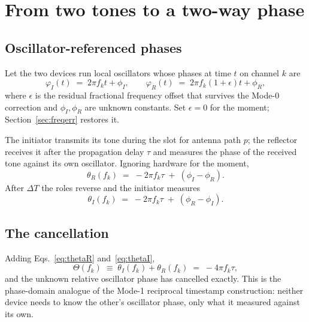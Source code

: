 \documentclass[11pt,a4paper]{article}
\begin{document}
\section{From two tones to a two-way phase}
\label{sec:twoway}

\subsection{Oscillator-referenced phases}

Let the two devices run local oscillators whose phases at time $t$ on channel $k$ are
\begin{equation}
\varphi_I(t) \;=\; 2\pi f_k t + \phi_I ,
\qquad
\varphi_R(t) \;=\; 2\pi f_k (1+\epsilon) t + \phi_R ,
\label{eq:los}
\end{equation}
where $\epsilon$ is the residual fractional frequency offset that survives the Mode-0 correction and
$\phi_I,\phi_R$ are unknown constants. Set $\epsilon=0$ for the moment; Section~\ref{sec:freqerr}
restores it.

The initiator transmits its tone during the slot for antenna path $p$; the reflector receives it
after the propagation delay $\tau$ and measures the phase of the received tone against its own
oscillator. Ignoring hardware for the moment,
\begin{equation}
\theta_R(f_k) \;=\; -2\pi f_k \tau \;+\; (\phi_I - \phi_R) .
\label{eq:thetaR}
\end{equation}
After $\Delta T$ the roles reverse and the initiator measures
\begin{equation}
\theta_I(f_k) \;=\; -2\pi f_k \tau \;+\; (\phi_R - \phi_I) .
\label{eq:thetaI}
\end{equation}

\subsection{The cancellation}

Adding Eqs.~\eqref{eq:thetaR} and~\eqref{eq:thetaI},
\begin{equation}
\Theta(f_k) \;\equiv\; \theta_I(f_k) + \theta_R(f_k) \;=\; -4\pi f_k \tau ,
\label{eq:twoway}
\end{equation}
and the unknown relative oscillator phase has cancelled exactly. This is the phase-domain analogue of
the Mode-1 reciprocal timestamp construction: neither device needs to know the other's oscillator
phase, only what it measured against its own.
\end{document}
